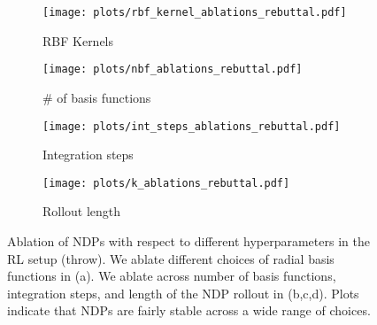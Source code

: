 \documentclass{article}
\newcommand{\ours}{NDPs\xspace}
\begin{document}
\begin{figure}[th!]
\centering
\begin{subfigure}[b]{0.24\linewidth}
    \texttt{[image: plots/rbf\_kernel\_ablations\_rebuttal.pdf]}
    \vspace{-0.2in}
    \caption{\small RBF Kernels}
    \label{fig:t-rl-ablation-1}
\end{subfigure}
\begin{subfigure}[b]{0.24\linewidth}
    \texttt{[image: plots/nbf\_ablations\_rebuttal.pdf]}
    \vspace{-0.2in}
    \caption{\small \# of basis functions}
    \label{fig:t-rl-ablation-2}
\end{subfigure}
\begin{subfigure}[b]{0.24\linewidth}
    \texttt{[image: plots/int\_steps\_ablations\_rebuttal.pdf]}
    \vspace{-0.2in}
    \caption{\small Integration steps}
    \label{fig:t-rl-ablation-3}
\end{subfigure}
\begin{subfigure}[b]{0.24\linewidth}
    \texttt{[image: plots/k\_ablations\_rebuttal.pdf]}
    \vspace{-0.2in}
    \caption{\small Rollout length}
    \label{fig:t-rl-ablation-4}
\end{subfigure}
\vspace{-0.06in}
\caption{\small Ablation of \ours with respect to different hyperparameters in  the RL setup (throw). We ablate different choices of radial basis functions in (a). We ablate across number of basis functions, integration steps, and length of the NDP rollout in (b,c,d). Plots indicate that NDPs are fairly stable across a wide range of choices.}
\vspace{-0.06in}
\label{fig:abl-throw}
\end{figure}
\end{document}
